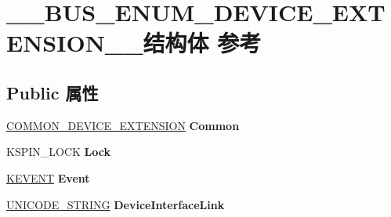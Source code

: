 \hypertarget{struct_____b_u_s___e_n_u_m___d_e_v_i_c_e___e_x_t_e_n_s_i_o_n____}{}\section{\+\_\+\+\_\+\+B\+U\+S\+\_\+\+E\+N\+U\+M\+\_\+\+D\+E\+V\+I\+C\+E\+\_\+\+E\+X\+T\+E\+N\+S\+I\+O\+N\+\_\+\+\_\+结构体 参考}
\label{struct_____b_u_s___e_n_u_m___d_e_v_i_c_e___e_x_t_e_n_s_i_o_n____}
\subsection*{Public 属性}
\begin{DoxyCompactItemize}
\item 
\mbox{\label{struct_____b_u_s___e_n_u_m___d_e_v_i_c_e___e_x_t_e_n_s_i_o_n_____a126061139a387651087e14620186d26c}} 
\hyperlink{struct_c_o_m_m_o_n___d_e_v_i_c_e___e_x_t_e_n_s_i_o_n}{C\+O\+M\+M\+O\+N\+\_\+\+D\+E\+V\+I\+C\+E\+\_\+\+E\+X\+T\+E\+N\+S\+I\+ON} {\bfseries Common}
\item 
\mbox{\label{struct_____b_u_s___e_n_u_m___d_e_v_i_c_e___e_x_t_e_n_s_i_o_n_____aac35bb9aa6529135172f3fd423d98ccf}} 
K\+S\+P\+I\+N\+\_\+\+L\+O\+CK {\bfseries Lock}
\item 
\mbox{\label{struct_____b_u_s___e_n_u_m___d_e_v_i_c_e___e_x_t_e_n_s_i_o_n_____a73c74181dd22e5bdc27c59fd53609c6d}} 
\hyperlink{struct___k_e_v_e_n_t}{K\+E\+V\+E\+NT} {\bfseries Event}
\item 
\mbox{\label{struct_____b_u_s___e_n_u_m___d_e_v_i_c_e___e_x_t_e_n_s_i_o_n_____a82a76cee387c0cccf4223eb63f46f990}} 
\hyperlink{struct___u_n_i_c_o_d_e___s_t_r_i_n_g}{U\+N\+I\+C\+O\+D\+E\+\_\+\+S\+T\+R\+I\+NG} {\bfseries Device\+Interface\+Link}
\item 
\mbox{\label{struct_____b_u_s___e_n_u_m___d_e_v_i_c_e___e_x_t_e_n_s_i_o_n_____aa77b3f8f8a37d87ff2b42963ffc8c883}} 

\end{DoxyCompactItemize}
